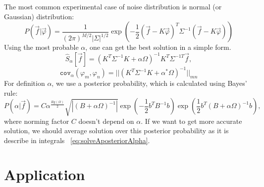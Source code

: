 \documentclass{webofc}
\begin{document}
The most common experimental case of noise distribution is normal (or Gaussian) distribution:
\begin{equation}	\label{eq:gaussP}
	P\left(\vec{f}|\vec{\varphi}\right) = \frac{1}{(2\pi)^{M/2}|\Sigma|^{1/2}} 
    \exp\left(-\frac{1}{2}(\vec{f} - K\vec{\varphi})^T\Sigma^{-1}(\vec{f} - K\vec{\varphi})\right)
\end{equation}
Using  the most probable $\alpha$, one can get the best solution in a simple form.
\begin{equation} \label{eq:analit_solv}
	\hat{S}_{\alpha}[\vec{f}] = (K^T\Sigma^{-1}K+\alpha\Omega)^{-1}K^T\Sigma^{-1T}\vec{f},
\end{equation}
\begin{equation} \label{eq:analit_var}
	\texttt{cov}_{\alpha}(\varphi_m, \varphi_n) = ||(K^T\Sigma^{-1}K+\alpha^*\Omega)^{-1}||_{mn}
\end{equation}
For definition $\alpha$, we use a posterior probability, which is calculated using Bayes' rule: 
\begin{equation}
	\label{eq:alphaaposter}
	P(\alpha|\vec{f}) = C \alpha^{\frac{Rg(\Omega)}{2}}\sqrt{|(B+\alpha\Omega)^{-1}|}\exp(-\frac{1}{2}b^{T}B^{-1}b)\exp(\frac{1}{2}b^{T}(B+\alpha\Omega)^{-1}b),
\end{equation}
where norming factor $C$  doesn't depend on $\alpha$. If we want to get more accurate solution, we should average solution over this posterior probability as it is describe in integrals ~\ref{eq:solveAposteriorAlpha}.

\section{Application}
\end{document}
